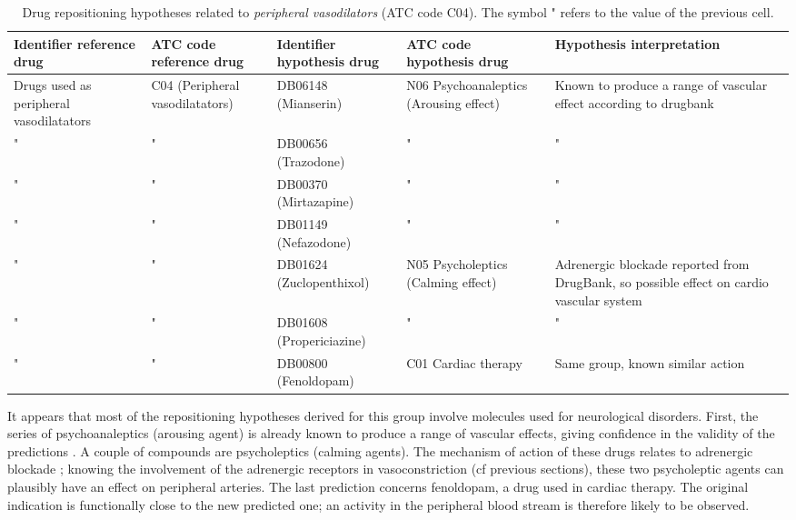 \begin{table}[htbp]
\scriptsize
\begin{tabular}{|p{2cm}|p{2cm}|p{2cm}|p{3cm}|p{4cm}|}
\hline
\textbf{Identifier reference drug} & \textbf{ATC code reference drug} & \textbf{Identifier hypothesis drug} & \textbf{ATC code hypothesis drug} & \textbf{Hypothesis interpretation} \\ \hline
Drugs used as peripheral vasodilatators & C04 (Peripheral vasodilatators) & DB06148 (Mianserin) & N06 Psychoanaleptics (Arousing effect) & Known to produce a range of vascular effect according to drugbank \\ \hline
" & " & DB00656 (Trazodone) & " & " \\ \hline
" & " & DB00370 (Mirtazapine) & " & " \\ \hline
" & " & DB01149 (Nefazodone) & " & " \\ \hline
" & " & DB01624 (Zuclopenthixol) & N05 Psycholeptics (Calming effect) & Adrenergic blockade reported from DrugBank, so possible effect on cardio vascular system \\ \hline
" & " & DB01608 (Propericiazine) & " & " \\ \hline
" & " & DB00800 (Fenoldopam) & C01 Cardiac therapy & Same group, known similar action \\ \hline
\end{tabular}
\caption{Drug repositioning hypotheses related to \emph{peripheral vasodilators} (ATC code C04). The symbol " refers to the value of the previous cell.}
\label{table:tablec04}
\end{table}

It appears that most of the repositioning hypotheses derived for this group involve molecules used for neurological disorders. First, the series of psychoanaleptics (arousing agent) is already known to produce a range of vascular effects, giving confidence in the validity of the predictions \citep{khalifa2003zuclopenthixol}. A couple of compounds are psycholeptics (calming agents). The mechanism of action of these drugs relates to adrenergic blockade \citep{khalifa2003zuclopenthixol}; knowing the involvement of the adrenergic receptors in vasoconstriction (cf previous sections), these two psycholeptic agents can plausibly have an effect on peripheral arteries. The last prediction concerns fenoldopam, a drug used in cardiac therapy. The original indication is functionally close to the new predicted one; an activity in the peripheral blood stream is therefore likely to be observed.

